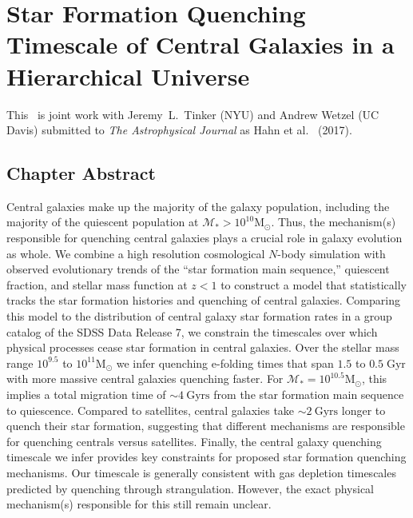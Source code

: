 \newcommand{\overbar}[1]{\mkern 1.5mu\overline{\mkern-1.5mu#1\mkern-1.5mu}\mkern 1.5mu}
\newcommand{\avgSFR}{\overline{\raisebox{0pt}[1.2\height]{SFR}}}
\newcommand{\SFR}{\mathrm{SFR}}
\newcommand{\fq}{f_\mathrm{Q}}
\newcommand{\fqcen}{f_\mathrm{Q}^\mathrm{cen}}
\newcommand{\zinit}{z_\mathrm{initial}}
\newcommand{\taucen}{\tau_\mathrm{Q}^\mathrm{cen}}

\chapter{Star Formation Quenching Timescale of Central Galaxies in a Hierarchical Universe
}

This \paper\ is joint work with Jeremy~L.~Tinker (NYU) and Andrew Wetzel (UC Davis)
submitted to \emph{The Astrophysical Journal} as Hahn et al. \ (2017). 

\section{Chapter Abstract}
Central galaxies make up the majority of the galaxy population, 
including the majority of the quiescent population at 
$\mathcal{M}_* > 10^{10}\mathrm{M}_\odot$. Thus, the mechanism(s) 
responsible for quenching central galaxies plays a crucial role 
in galaxy evolution as whole.
We combine a high resolution cosmological $N$-body simulation 
with observed evolutionary trends of the ``star formation main sequence,''
quiescent fraction, and stellar mass function at $z < 1$ to 
construct a model that statistically tracks the star formation 
histories and quenching of central galaxies. 
Comparing this model to the distribution of central galaxy 
star formation rates in a group catalog of the SDSS 
Data Release 7, we constrain the timescales over 
which physical processes cease star formation in central galaxies.
Over the stellar mass range $10^{9.5}$ to $10^{11} \mathrm{M}_\odot$ 
we infer quenching e-folding times that span $1.5$ to $0.5\; \mathrm{Gyr}$ 
with more massive central galaxies quenching faster. 
For $\mathcal{M}_* = 10^{10.5}\mathrm{M}_\odot$, this implies a total
migration time of $\sim 4~\mathrm{Gyrs}$ from the star formation main sequence
to quiescence. Compared to satellites, central galaxies take 
$\sim 2~\mathrm{Gyrs}$ longer to quench their star formation, 
suggesting that different mechanisms are responsible for 
quenching centrals versus satellites. Finally, the central galaxy 
quenching timescale we infer provides key constraints for proposed star formation 
quenching mechanisms. Our timescale is generally consistent 
with gas depletion timescales predicted by quenching through 
strangulation. However, the exact physical mechanism(s) 
responsible for this still remain unclear.

